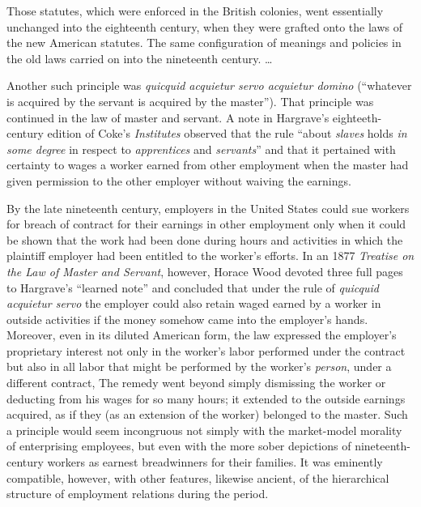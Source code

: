 \documentclass[
  letterpaper,
  11pt,
  DIV=9,
  openright]{scrbook}
\begin{document}
Those statutes, which were enforced in the British colonies, went
essentially unchanged into the eighteenth century, when they were
grafted onto the laws of the new American statutes. The same
configuration of meanings and policies in the old laws carried on into
the nineteenth century. \ldots{}

Another such principle was \emph{quicquid acquietur servo acquietur
domino} (``whatever is acquired by the servant is acquired by the
master''). That principle was continued in the law of master and
servant. A note in Hargrave's eighteeth-century edition of Coke's
\emph{Institutes} observed that the rule ``about \emph{slaves} holds
\emph{in some degree} in respect to \emph{apprentices} and
\emph{servants}'' and that it pertained with certainty to wages a worker
earned from other employment when the master had given permission to the
other employer without waiving the earnings.


By the late nineteenth century, employers in the United States could sue
workers for breach of contract for their earnings in other employment
only when it could be shown that the work had been done during hours and
activities in which the plaintiff employer had been entitled to the
worker's efforts. In an 1877 \emph{Treatise on the Law of Master and
Servant}, however, Horace Wood devoted three full pages to Hargrave's
``learned note'' and concluded that under the rule of \emph{quicquid
acquietur servo} the employer could also retain waged earned by a worker
in outside activities if the money somehow came into the employer's
hands. Moreover, even in its diluted American form, the law expressed
the employer's proprietary interest not only in the worker's labor
performed under the contract but also in all labor that might be
performed by the worker's \emph{person}, under a different contract, The
remedy went beyond simply dismissing the worker or deducting from his
wages for so many hours; it extended to the outside earnings acquired,
as if they (as an extension of the worker) belonged to the master. Such
a principle would seem incongruous not simply with the market-model
morality of enterprising employees, but even with the more sober
depictions of nineteenth-century workers as earnest breadwinners for
their families. It was eminently compatible, however, with other
features, likewise ancient, of the hierarchical structure of employment
relations during the period.
\end{document}

